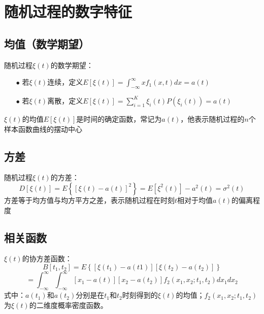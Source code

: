 \documentclass[12pt,a4paper,oneside]{ctexart}
\begin{document}
\section{随机过程的数字特征}
\subsection{均值（数学期望）}
\indent 随机过程$\xi(t)$的数学期望：
    \begin{itemize}
        \item [$\bullet$] 若$\xi(t)$连续，定义$E[\xi(t)] = \int_{-\infty }^{\infty } xf_{1}(x,t)dx = a(t)$
        \item [$\bullet$] 若$\xi(t)$离散，定义$E[\xi(t)] =  {\textstyle \sum_{i=1}^{K}}\xi_{i}(t)P(\xi_{i}(t))=a(t)$ 
    \end{itemize}
\indent \indent $\xi (t)$的均值$E\left [ \xi(t) \right ] $是时间的确定函数，常记为$a(t)$，他表示随机过程的$n$个样本函数曲线的摆动中心\\

\subsection{方差}
\indent 随机过程$\xi(t)$的方差：
$$
D\left[\xi(t)\right] = E\left\{\left[\xi(t)-a(t)\right]^{2}\right\} = E[\xi^{2}(t)] - a^{2}(t) = \sigma^{2}(t)
$$
\indent 方差等于均方值与均方平方之差，表示随机过程在时刻$t$相对于均值$a(t)$的偏离程度

\subsection{相关函数}
\indent $\xi(t)$的协方差函数：
$$
B[t_{1},t_{2}] = E\left\{[\xi(t_{1}) - a(t1)][\xi(t_{2}) - a(t_{2})]\right\} 
$$
$$
= \int_{-\infty }^{\infty } \int_{-\infty}^{\infty}[x_{1} - a(t)][x_{2} - a(t_{2})]f_{2}(x_{1},x_{2};t_{1},t_{2})dx_{1}dx_{2}
$$
\indent 式中：$a(t_{1})$和$a(t_{2})$分别是在$t_{1}$和$t_{2}$时刻得到的$\xi(t)$的均值；$f_{2}(x_{1},x_{2};t_{1},t_{2})$为$\xi(t)$的二维度概率密度函数。
\end{document}
